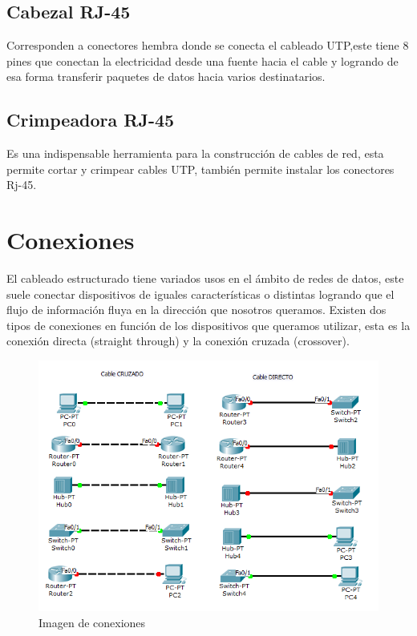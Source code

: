 \documentclass[spanish]{udpreport}
\begin{document}
\subsection{Cabezal RJ-45}
Corresponden a conectores hembra donde se conecta el cableado UTP,este tiene 8 pines que conectan la electricidad desde una fuente hacia el cable y logrando de esa forma transferir paquetes de datos hacia varios destinatarios.

\subsection{Crimpeadora RJ-45}
Es una indispensable herramienta para la construcción de cables de red, esta permite cortar y crimpear cables UTP, también permite instalar los conectores Rj-45.
\newpage
\section{Conexiones}
El cableado estructurado tiene variados usos en el ámbito de redes de datos, este suele conectar dispositivos de iguales características o distintas logrando que el flujo de información fluya en la dirección que nosotros queramos.
Existen dos tipos de conexiones en función de los dispositivos que queramos utilizar, esta es la conexión directa (straight through) y la conexión cruzada (crossover).

\begin{figure}[h]
    \centering
    \includegraphics{images/tipos-cables-conexion.png}
    \caption{Imagen de conexiones}
    \label{fig:my_label}
\end{figure}
\end{document}
